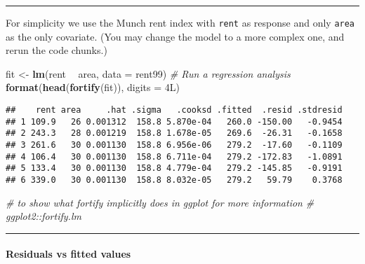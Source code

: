\documentclass[]{article}
\newenvironment{Shaded}{\begin{snugshade}}{\end{snugshade}}
\newcommand{\CommentTok}[1]{\textcolor[rgb]{0.56,0.35,0.01}{\textit{#1}}}
\newcommand{\DataTypeTok}[1]{\textcolor[rgb]{0.13,0.29,0.53}{#1}}
\newcommand{\KeywordTok}[1]{\textcolor[rgb]{0.13,0.29,0.53}{\textbf{#1}}}
\newcommand{\NormalTok}[1]{#1}
\newcommand{\OperatorTok}[1]{\textcolor[rgb]{0.81,0.36,0.00}{\textbf{#1}}}
\newcommand{\StringTok}[1]{\textcolor[rgb]{0.31,0.60,0.02}{#1}}
\let\oldparagraph\paragraph
\renewcommand{\paragraph}[1]{\oldparagraph{#1}\mbox{}}
\begin{document}
\begin{center}\rule{0.5\linewidth}{\linethickness}\end{center}

For simplicity we use the Munch rent index with \texttt{rent} as
response and only \texttt{area} as the only covariate. (You may change
the model to a more complex one, and rerun the code chunks.)

\footnotesize

\begin{Shaded}
\begin{Highlighting}[]
\NormalTok{fit <-}\StringTok{ }\KeywordTok{lm}\NormalTok{(rent }\OperatorTok{~}\StringTok{ }\NormalTok{area, }\DataTypeTok{data =}\NormalTok{ rent99)  }\CommentTok{# Run a regression analysis}
\KeywordTok{format}\NormalTok{(}\KeywordTok{head}\NormalTok{(}\KeywordTok{fortify}\NormalTok{(fit)), }\DataTypeTok{digits =}\NormalTok{ 4L)}
\end{Highlighting}
\end{Shaded}

\begin{verbatim}
##    rent area     .hat .sigma   .cooksd .fitted  .resid .stdresid
## 1 109.9   26 0.001312  158.8 5.870e-04   260.0 -150.00   -0.9454
## 2 243.3   28 0.001219  158.8 1.678e-05   269.6  -26.31   -0.1658
## 3 261.6   30 0.001130  158.8 6.956e-06   279.2  -17.60   -0.1109
## 4 106.4   30 0.001130  158.8 6.711e-04   279.2 -172.83   -1.0891
## 5 133.4   30 0.001130  158.8 4.779e-04   279.2 -145.85   -0.9191
## 6 339.0   30 0.001130  158.8 8.032e-05   279.2   59.79    0.3768
\end{verbatim}

\begin{Shaded}
\begin{Highlighting}[]
\CommentTok{# to show what fortify implicitly does in ggplot for more information}
\CommentTok{# ggplot2::fortify.lm}
\end{Highlighting}
\end{Shaded}

\normalsize

\begin{center}\rule{0.5\linewidth}{\linethickness}\end{center}

\hypertarget{residuals-vs-fitted-values}{%
\paragraph{Residuals vs fitted
values}\label{residuals-vs-fitted-values}}
\end{document}
